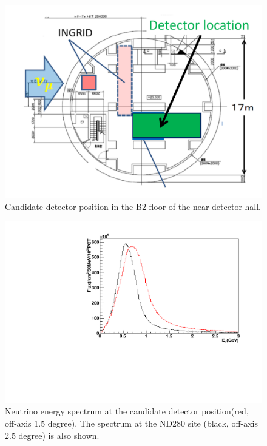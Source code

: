\begin{figure}[tbhp]
\begin{center}
\includegraphics[width=0.7\linewidth]{fig/detector_position_b2.pdf}
\end{center}
\caption{
Candidate detector position in the B2 floor of the near detector hall.
}
\label{fig:location}
\end{figure}

\begin{figure}[tbhp]
\begin{center}
\includegraphics[width=0.4\linewidth, angle=270]{fig/b2_nd280_fluxes.pdf}
\end{center}
\caption{
Neutrino energy spectrum at the candidate detector position(red, off-axis 1.5 degree).
The spectrum at the ND280 site (black, off-axis 2.5 degree) is also shown.
}
\label{fig:b2flux}
\end{figure}

